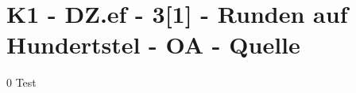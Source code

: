 \section{K1 - DZ.ef - 3[1] - Runden auf Hundertstel - OA - Quelle}

\begin{langesbeispiel}\item[0] %
Test

\end{langesbeispiel}